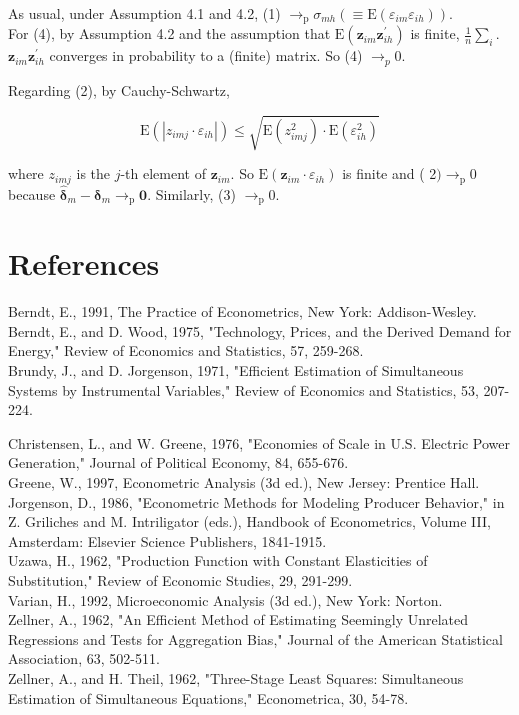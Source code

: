 \documentclass[10pt]{article}
\begin{document}
As usual, under Assumption 4.1 and 4.2, (1) $\rightarrow_{\mathrm{p}} \sigma_{m h}\left(\equiv \mathrm{E}\left(\varepsilon_{i m} \varepsilon_{i h}\right)\right)$.\\
For (4), by Assumption 4.2 and the assumption that $\mathrm{E}\left(\mathbf{z}_{i m} \mathbf{z}_{i h}^{\prime}\right)$ is finite, $\frac{1}{n} \sum_{i}$. $\mathbf{z}_{i m} \mathbf{z}_{i h}^{\prime}$ converges in probability to a (finite) matrix. So (4) $\rightarrow_{p} 0$.

Regarding (2), by Cauchy-Schwartz,

$$
\mathrm{E}\left(\left|z_{i m j} \cdot \varepsilon_{i h}\right|\right) \leq \sqrt{\mathrm{E}\left(z_{i m j}^{2}\right) \cdot \mathrm{E}\left(\varepsilon_{i h}^{2}\right)}
$$

where $z_{i m j}$ is the $j$-th element of $\mathbf{z}_{i m}$. So $\mathrm{E}\left(\mathbf{z}_{i m} \cdot \varepsilon_{i h}\right)$ is finite and ( 2$) \rightarrow_{\mathrm{p}} 0$ because $\hat{\boldsymbol{\delta}}_{m}-\boldsymbol{\delta}_{m} \rightarrow_{\mathrm{p}} \mathbf{0}$. Similarly, (3) $\rightarrow_{\mathrm{p}} 0$.

\section*{References}
Berndt, E., 1991, The Practice of Econometrics, New York: Addison-Wesley.\\
Berndt, E., and D. Wood, 1975, "Technology, Prices, and the Derived Demand for Energy," Review of Economics and Statistics, 57, 259-268.\\
Brundy, J., and D. Jorgenson, 1971, "Efficient Estimation of Simultaneous Systems by Instrumental Variables," Review of Economics and Statistics, 53, 207-224.

Christensen, L., and W. Greene, 1976, "Economies of Scale in U.S. Electric Power Generation," Journal of Political Economy, 84, 655-676.\\
Greene, W., 1997, Econometric Analysis (3d ed.), New Jersey: Prentice Hall.\\
Jorgenson, D., 1986, "Econometric Methods for Modeling Producer Behavior," in Z. Griliches and M. Intriligator (eds.), Handbook of Econometrics, Volume III, Amsterdam: Elsevier Science Publishers, 1841-1915.\\
Uzawa, H., 1962, "Production Function with Constant Elasticities of Substitution," Review of Economic Studies, 29, 291-299.\\
Varian, H., 1992, Microeconomic Analysis (3d ed.), New York: Norton.\\
Zellner, A., 1962, "An Efficient Method of Estimating Seemingly Unrelated Regressions and Tests for Aggregation Bias," Journal of the American Statistical Association, 63, 502-511.\\
Zellner, A., and H. Theil, 1962, "Three-Stage Least Squares: Simultaneous Estimation of Simultaneous Equations," Econometrica, 30, 54-78.
\end{document}
